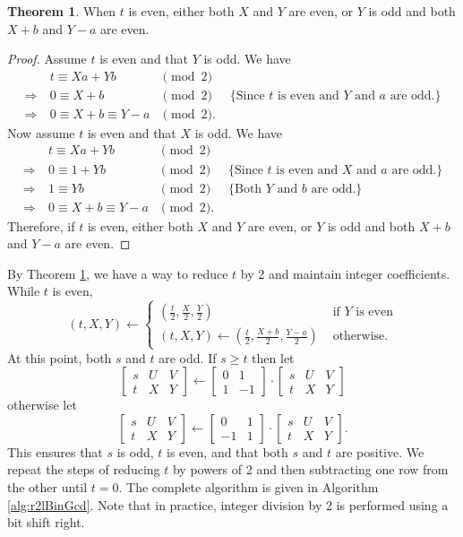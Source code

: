 \documentclass{ucalgthes1}
\theoremstyle{definition}
\newtheorem{thm}{Theorem}[section]
\newcommand{\matrixtt}[4]{\left[ \begin{array}{rr} #1 & #2 \\ #3 & #4 \end{array} \right]}
\newcommand{\matrixThreeTwo}[6]{\left[ \begin{array}{rrr} #1 & #2 & #3 \\ #4 & #5 & #6 \end{array} \right]}
\begin{document}
\begin{thm}
\label{thm:addBSubA}
When $t$ is even, either both $X$ and $Y$ are even, or $Y$ is odd and both $X+b$ and $Y-a$ are even.
\end{thm}

\begin{proof}
Assume $t$ is even and that $Y$ is odd.  We have
\[
\begin{array}{rllr}
	         & t \equiv Xa + Yb & \pmod 2 \\
\Rightarrow~ & 0 \equiv X + b & \pmod 2 & \textrm{ \{Since $t$ is even and $Y$ and $a$ are odd.\}} \\
\Rightarrow~ & 0 \equiv X + b \equiv Y - a & \pmod 2. 
\end{array}
\]
Now assume $t$ is even and that $X$ is odd.  We have
\[
\begin{array}{rllr}
	         & t \equiv Xa + Yb & \pmod 2 \\
\Rightarrow~ & 0 \equiv 1 + Yb & \pmod 2 & \textrm{ \{Since $t$ is even and $X$ and $a$ are odd.\}} \\
\Rightarrow~ & 1 \equiv Yb & \pmod 2 & \textrm{ \{Both $Y$ and $b$ are odd.\}} \\
\Rightarrow~ & 0 \equiv X + b \equiv Y - a & \pmod 2. 
\end{array}
\]
Therefore, if $t$ is even, either both $X$ and $Y$ are even, or $Y$ is odd and both $X+b$ and $Y-a$ are even.
\end{proof}

By Theorem \ref{thm:addBSubA}, we have a way to reduce $t$ by 2 and maintain integer coefficients.  While $t$ is even, 
\[
	(t, X, Y) \gets \begin{cases}
		\left( \frac{t}{2}, \frac{X}{2}, \frac{Y}{2} \right) &
			\textrm{ if $Y$ is even} \\
		(t, X, Y) \gets \left( \frac{t}{2}, \frac{X+b}{2}, \frac{Y-a}{2} \right) & 
			\textrm{ otherwise.}
	\end{cases}
\]
At this point, both $s$ and $t$ are odd.  If $s \ge t$ then let
\[
	\matrixThreeTwo{s}{U}{V}{t}{X}{Y} \gets \matrixtt{0}{1}{1}{-1} \cdot \matrixThreeTwo{s}{U}{V}{t}{X}{Y}
\]
otherwise let
\[
	\matrixThreeTwo{s}{U}{V}{t}{X}{Y} \gets \matrixtt{0}{1}{-1}{1} \cdot \matrixThreeTwo{s}{U}{V}{t}{X}{Y}.
\]
This ensures that $s$ is odd, $t$ is even, and that both $s$ and $t$ are positive.  We repeat the steps of reducing $t$ by powers of 2 and then subtracting one row from the other until $t=0$.  The complete algorithm is given in Algorithm \ref{alg:r2lBinGcd}.  Note that in practice, integer division by 2 is performed using a bit shift right.
\end{document}
